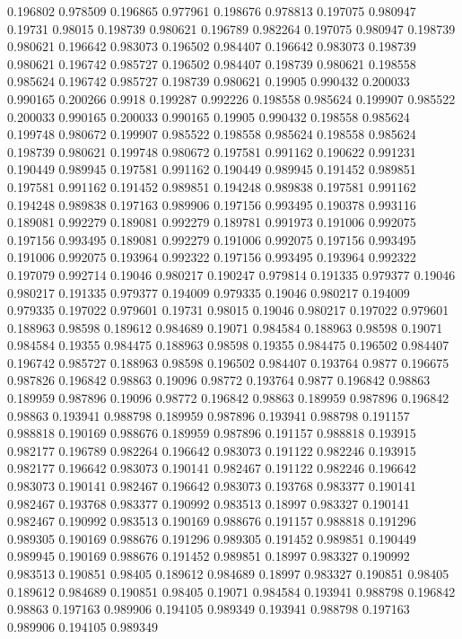 0.196802 0.978509
0.196865 0.977961
0.198676 0.978813
0.197075 0.980947
0.19731 0.98015
0.198739 0.980621
0.196789 0.982264
0.197075 0.980947
0.198739 0.980621
0.196642 0.983073
0.196502 0.984407
0.196642 0.983073
0.198739 0.980621
0.196742 0.985727
0.196502 0.984407
0.198739 0.980621
0.198558 0.985624
0.196742 0.985727
0.198739 0.980621
0.19905 0.990432
0.200033 0.990165
0.200266 0.9918
0.199287 0.992226
0.198558 0.985624
0.199907 0.985522
0.200033 0.990165
0.200033 0.990165
0.19905 0.990432
0.198558 0.985624
0.199748 0.980672
0.199907 0.985522
0.198558 0.985624
0.198558 0.985624
0.198739 0.980621
0.199748 0.980672
0.197581 0.991162
0.190622 0.991231
0.190449 0.989945
0.197581 0.991162
0.190449 0.989945
0.191452 0.989851
0.197581 0.991162
0.191452 0.989851
0.194248 0.989838
0.197581 0.991162
0.194248 0.989838
0.197163 0.989906
0.197156 0.993495
0.190378 0.993116
0.189081 0.992279
0.189081 0.992279
0.189781 0.991973
0.191006 0.992075
0.197156 0.993495
0.189081 0.992279
0.191006 0.992075
0.197156 0.993495
0.191006 0.992075
0.193964 0.992322
0.197156 0.993495
0.193964 0.992322
0.197079 0.992714
0.19046 0.980217
0.190247 0.979814
0.191335 0.979377
0.19046 0.980217
0.191335 0.979377
0.194009 0.979335
0.19046 0.980217
0.194009 0.979335
0.197022 0.979601
0.19731 0.98015
0.19046 0.980217
0.197022 0.979601
0.188963 0.98598
0.189612 0.984689
0.19071 0.984584
0.188963 0.98598
0.19071 0.984584
0.19355 0.984475
0.188963 0.98598
0.19355 0.984475
0.196502 0.984407
0.196742 0.985727
0.188963 0.98598
0.196502 0.984407
0.193764 0.9877
0.196675 0.987826
0.196842 0.98863
0.19096 0.98772
0.193764 0.9877
0.196842 0.98863
0.189959 0.987896
0.19096 0.98772
0.196842 0.98863
0.189959 0.987896
0.196842 0.98863
0.193941 0.988798
0.189959 0.987896
0.193941 0.988798
0.191157 0.988818
0.190169 0.988676
0.189959 0.987896
0.191157 0.988818
0.193915 0.982177
0.196789 0.982264
0.196642 0.983073
0.191122 0.982246
0.193915 0.982177
0.196642 0.983073
0.190141 0.982467
0.191122 0.982246
0.196642 0.983073
0.190141 0.982467
0.196642 0.983073
0.193768 0.983377
0.190141 0.982467
0.193768 0.983377
0.190992 0.983513
0.18997 0.983327
0.190141 0.982467
0.190992 0.983513
0.190169 0.988676
0.191157 0.988818
0.191296 0.989305
0.190169 0.988676
0.191296 0.989305
0.191452 0.989851
0.190449 0.989945
0.190169 0.988676
0.191452 0.989851
0.18997 0.983327
0.190992 0.983513
0.190851 0.98405
0.189612 0.984689
0.18997 0.983327
0.190851 0.98405
0.189612 0.984689
0.190851 0.98405
0.19071 0.984584
0.193941 0.988798
0.196842 0.98863
0.197163 0.989906
0.194105 0.989349
0.193941 0.988798
0.197163 0.989906
0.194105 0.989349
